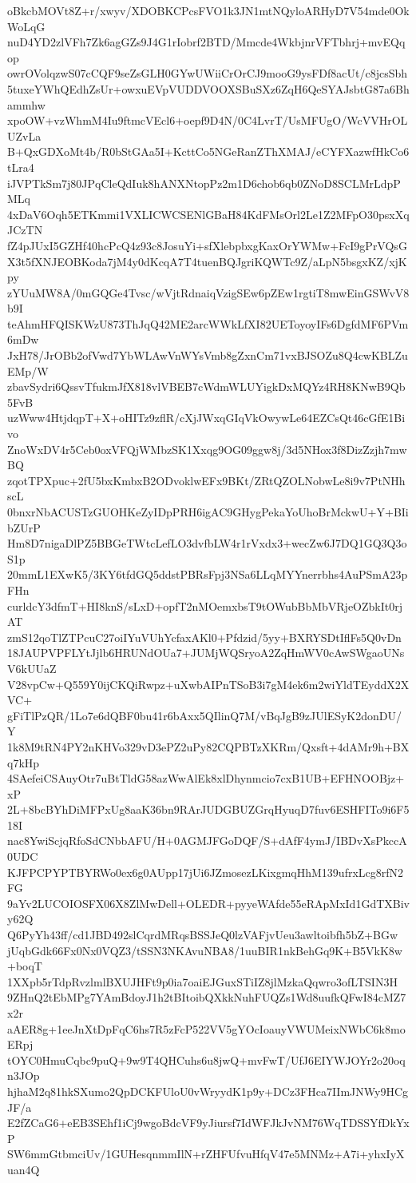 oBkcbMOVt8Z+r/xwyv/XDOBKCPcsFVO1k3JN1mtNQyloARHyD7V54mde0OkWoLqG
nuD4YD2zlVFh7Zk6agGZs9J4G1rIobrf2BTD/Mmcde4WkbjnrVFTbhrj+mvEQqop
owrOVolqzwS07cCQF9seZsGLH0GYwUWiiCrOrCJ9mooG9ysFDf8acUt/c8jcsSbh
5tuxeYWhQEdhZsUr+owxuEVpVUDDVOOXSBuSXz6ZqH6QeSYAJsbtG87a6Bhammhw
xpoOW+vzWhmM4Iu9ftmcVEcl6+oepf9D4N/0C4LvrT/UsMFUgO/WcVVHrOLUZvLa
B+QxGDXoMt4b/R0bStGAa5I+KcttCo5NGeRanZThXMAJ/eCYFXazwfHkCo6tLra4
iJVPTkSm7j80JPqCleQdIuk8hANXNtopPz2m1D6chob6qb0ZNoD8SCLMrLdpPMLq
4xDaV6Oqh5ETKmmi1VXLICWCSENlGBaH84KdFMsOrl2Le1Z2MFpO30psxXqJCzTN
fZ4pJUxI5GZHf40hcPcQ4z93c8JosuYi+sfXlebpbxgKaxOrYWMw+FcI9gPrVQsG
X3t5fXNJEOBKoda7jM4y0dKcqA7T4tuenBQJgriKQWTc9Z/aLpN5bsgxKZ/xjKpy
zYUuMW8A/0mGQGe4Tvsc/wVjtRdnaiqVzigSEw6pZEw1rgtiT8mwEinGSWvV8b9I
teAhmHFQISKWzU873ThJqQ42ME2arcWWkLfXI82UEToyoyIFs6DgfdMF6PVm6mDw
JxH78/JrOBb2ofVwd7YbWLAwVnWYsVmb8gZxnCm71vxBJSOZu8Q4cwKBLZuEMp/W
zbavSydri6QssvTfukmJfX818vlVBEB7cWdmWLUYigkDxMQYz4RH8KNwB9Qb5FvB
uzWww4HtjdqpT+X+oHITz9zflR/cXjJWxqGIqVkOwywLe64EZCsQt46cGfE1Bivo
ZnoWxDV4r5Ceb0oxVFQjWMbzSK1Xxqg9OG09ggw8j/3d5NHox3f8DizZzjh7mwBQ
zqotTPXpuc+2fU5bxKmbxB2ODvoklwEFx9BKt/ZRtQZOLNobwLe8i9v7PtNHhscL
0bnxrNbACUSTzGUOHKeZyIDpPRH6igAC9GHygPekaYoUhoBrMckwU+Y+BIibZUrP
Hm8D7nigaDlPZ5BBGeTWtcLefLO3dvfbLW4r1rVxdx3+wecZw6J7DQ1GQ3Q3oS1p
20mmL1EXwK5/3KY6tfdGQ5ddstPBRsFpj3NSa6LLqMYYnerrbhs4AuPSmA23pFHn
curldcY3dfmT+HI8knS/sLxD+opfT2nMOemxbsT9tOWubBbMbVRjeOZbkIt0rjAT
zmS12qoTlZTPcuC27oiIYuVUhYcfaxAKl0+Pfdzid/5yy+BXRYSDtIflFs5Q0vDn
18JAUPVPFLYtJjlb6HRUNdOUa7+JUMjWQSryoA2ZqHmWV0cAwSWgaoUNsV6kUUaZ
V28vpCw+Q559Y0ijCKQiRwpz+uXwbAIPnTSoB3i7gM4ek6m2wiYldTEyddX2XVC+
gFiTlPzQR/1Lo7e6dQBF0bu41r6bAxx5QIlinQ7M/vBqJgB9zJUlESyK2donDU/Y
1k8M9tRN4PY2nKHVo329vD3ePZ2uPy82CQPBTzXKRm/Qxsft+4dAMr9h+BXq7kHp
4SAefeiCSAuyOtr7uBtTldG58azWwAlEk8xlDhynmcio7cxB1UB+EFHNOOBjz+xP
2L+8bcBYhDiMFPxUg8aaK36bn9RArJUDGBUZGrqHyuqD7fuv6ESHFITo9i6F518I
nac8YwiScjqRfoSdCNbbAFU/H+0AGMJFGoDQF/S+dAfF4ymJ/IBDvXsPkccA0UDC
KJFPCPYPTBYRWo0ex6g0AUpp17jUi6JZmosezLKixgmqHhM139ufrxLcg8rfN2FG
9aYv2LUCOIOSFX06X8ZlMwDell+OLEDR+pyyeWAfde55eRApMxId1GdTXBivy62Q
Q6PyYh43ff/cd1JBD492slCqrdMRqsBSSJeQ0lzVAFjvUeu3awltoibfh5bZ+BGw
jUqbGdk66Fx0Nx0VQZ3/tSSN3NKAvuNBA8/1uuBIR1nkBehGq9K+B5VkK8w+boqT
1XXpb5rTdpRvzlmlBXUJHFt9p0ia7oaiEJGuxSTiIZ8jlMzkaQqwro3ofLTSIN3H
9ZHnQ2tEbMPg7YAmBdoyJ1h2tBItoibQXkkNuhFUQZs1Wd8uufkQFwI84cMZ7x2r
aAER8g+1eeJnXtDpFqC6hs7R5zFcP522VV5gYOcIoauyVWUMeixNWbC6k8moERpj
tOYC0HmuCqbc9puQ+9w9T4QHCuhs6u8jwQ+mvFwT/UfJ6EIYWJOYr2o20oqn3JOp
hjhaM2q81hkSXumo2QpDCKFUloU0vWryydK1p9y+DCz3FHca7IImJNWy9HCgJF/a
E2fZCaG6+eEB3SEhf1iCj9wgoBdcVF9yJiursf7IdWFJkJvNM76WqTDSSYfDkYxP
SW6mmGtbmciUv/1GUHesqnmmIlN+rZHFUfvuHfqV47e5MNMz+A7i+yhxIyXuan4Q
